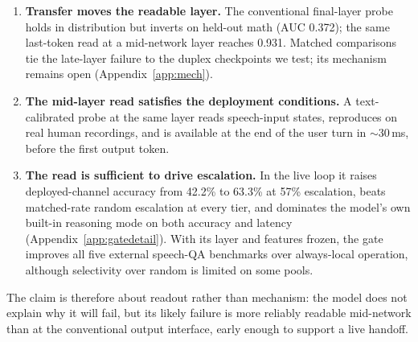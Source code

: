 \begin{enumerate}
\item \textbf{Transfer moves the readable layer.} The conventional
  final-layer probe holds in distribution but inverts on held-out math
  (AUC 0.372); the same last-token read at a mid-network layer reaches
  0.931. Matched comparisons tie the late-layer failure to the duplex
  checkpoints we test; its mechanism remains open
  (Appendix~\ref{app:mech}).
\item \textbf{The mid-layer read satisfies the deployment
  conditions.} A text-calibrated probe at the same layer reads
  speech-input states, reproduces on real human recordings, and is
  available at the end of the user turn in $\sim$30\,ms, before the
  first output token.
\item \textbf{The read is sufficient to drive escalation.} In the
  live loop it raises deployed-channel accuracy from 42.2\% to 63.3\%
  at 57\% escalation, beats matched-rate random escalation at every
  tier, and dominates the model's own built-in reasoning mode on both
  accuracy and latency (Appendix~\ref{app:gatedetail}). With its layer
  and features frozen, the gate improves all five external speech-QA
  benchmarks over always-local operation, although selectivity over
  random is limited on some pools.
\end{enumerate}

The claim is therefore about readout rather than mechanism: the model
does not explain why it will fail, but its likely failure is more
reliably readable mid-network than at the conventional output
interface, early enough to support a live handoff.
